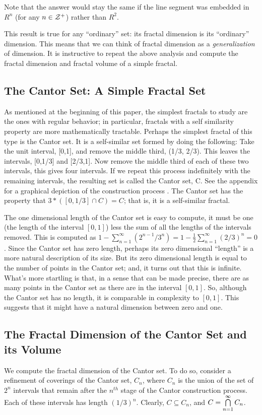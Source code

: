 {Note that the answer would stay the same if the line segment was 
embedded in $R^n$ (for any $n \in {\cal Z}^+$) rather than $R^2$.


This result is true for any ``ordinary'' set: its fractal dimension is its
``ordinary'' dimension. This means that we can think of fractal
dimension as a {\it generalization} of dimension. It is 
instructive to repeat the above analysis and compute the fractal dimension 
and fractal volume of a simple fractal.


\subsection{The Cantor Set: A Simple Fractal Set}

As mentioned at the beginning of this paper, the simplest fractals to
study are the ones with regular behavior; in particular, fractals with a
self similarity property are more mathematically tractable. Perhaps
the simplest fractal of this type is 
the Cantor set. It is a self-similar set formed by doing the following:
Take the unit interval, [0,1], and remove the middle third, (1/3,
2/3). This leaves the intervals, [0,1/3] and [2/3,1]. Now remove the
middle third of each of these two intervals, this gives four
intervals.
If we repeat this process indefinitely with the remaining
intervals, the resulting set is called the Cantor set, C. See 
the appendix for a graphical depiction of the construction process . 
The Cantor
set has the property that $3 * \left([0,1/3] \cap C\right) = C$; that is, 
it is a self-similar fractal. 

The one dimensional length of the Cantor set is
easy to compute, it must be one (the length of the interval $[0,1]$) 
less the sum of all the lengths of the
intervals removed. This is computed as $1
- \sum_{n=1}^\infty (2^{n-1}/3^n) = 1 - \frac{1}{2}
\sum_{n=1}^\infty (2/3)^n = 0$. Since the Cantor set has zero length,
perhaps its zero dimensional ``length'' is a more natural description
of its size. But its zero dimensional length is equal to the 
number of points in the Cantor set; and, it turns out that this is infinite. 
What's more startling is
that, in a sense that can be made precise, there are as many points in
the Cantor set as there are in the interval $[0,1]$. So, although the 
Cantor set has no length, it is comparable in complexity
to $[0,1]$. This suggests that it might have a natural dimension
between zero and one.

\subsection{The Fractal Dimension of the Cantor Set and its Volume}
We compute the fractal dimension of the Cantor set. To do so, 
consider a refinement of coverings of the Cantor set, $C_n$, where
$C_n$ is the union of the set of $2^n$ intervals that remain after 
the $n^{th}$ stage of the Cantor construction process. Each of these 
intervals has length $(1/3)^n$. 
Clearly, $C \subseteq C_n$, and $C = \bigcap_{n=1}^\infty\limits C_n$. 

}
